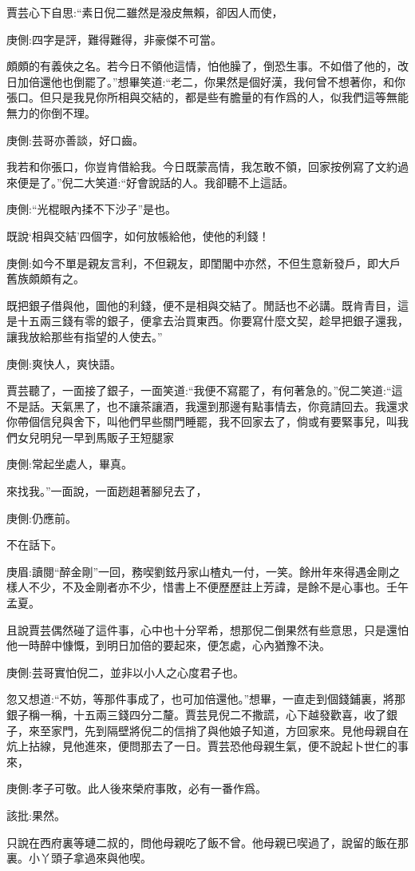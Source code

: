 \begin{parag}
    賈芸心下自思:“素日倪二雖然是潑皮無賴，卻因人而使，\begin{note}庚側:四字是評，難得難得，非豪傑不可當。\end{note}頗頗的有義俠之名。若今日不領他這情，怕他臊了，倒恐生事。不如借了他的，改日加倍還他也倒罷了。”想畢笑道:“老二，你果然是個好漢，我何曾不想著你，和你張口。但只是我見你所相與交結的，都是些有膽量的有作爲的人，似我們這等無能無力的你倒不理。\begin{note}庚側:芸哥亦善談，好口齒。\end{note}我若和你張口，你豈肯借給我。今日既蒙高情，我怎敢不領，回家按例寫了文約過來便是了。”倪二大笑道:“好會說話的人。我卻聽不上這話。\begin{note}庚側:“光棍眼內揉不下沙子”是也。\end{note}既說‘相與交結’四個字，如何放帳給他，使他的利錢！\begin{note}庚側:如今不單是親友言利，不但親友，即閨閣中亦然，不但生意新發戶，即大戶舊族頗頗有之。\end{note}既把銀子借與他，圖他的利錢，便不是相與交結了。閒話也不必講。既肯青目，這是十五兩三錢有零的銀子，便拿去治買東西。你要寫什麼文契，趁早把銀子還我，讓我放給那些有指望的人使去。”\begin{note}庚側:爽快人，爽快語。\end{note}賈芸聽了，一面接了銀子，一面笑道:“我便不寫罷了，有何著急的。”倪二笑道:“這不是話。天氣黑了，也不讓茶讓酒，我還到那邊有點事情去，你竟請回去。我還求你帶個信兒與舍下，叫他們早些關門睡罷，我不回家去了，倘或有要緊事兒，叫我們女兒明兒一早到馬販子王短腿家\begin{note}庚側:常起坐處人，畢真。\end{note}來找我。”一面說，一面趔趄著腳兒去了，\begin{note}庚側:仍應前。\end{note}不在話下。\begin{note}庚眉:讀閱“醉金剛”一回，務喫劉鉉丹家山楂丸一付，一笑。餘卅年來得遇金剛之樣人不少，不及金剛者亦不少，惜書上不便歷歷註上芳諱，是餘不是心事也。壬午孟夏。\end{note}
\end{parag}


\begin{parag}
    且說賈芸偶然碰了這件事，心中也十分罕希，想那倪二倒果然有些意思，只是還怕他一時醉中慷慨，到明日加倍的要起來，便怎處，心內猶豫不決。\begin{note}庚側:芸哥實怕倪二，並非以小人之心度君子也。\end{note}忽又想道:“不妨，等那件事成了，也可加倍還他。”想畢，一直走到個錢鋪裏，將那銀子稱一稱，十五兩三錢四分二釐。賈芸見倪二不撒謊，心下越發歡喜，收了銀子，來至家門，先到隔壁將倪二的信捎了與他娘子知道，方回家來。見他母親自在炕上拈線，見他進來，便問那去了一日。賈芸恐他母親生氣，便不說起卜世仁的事來，\begin{note}庚側:孝子可敬。此人後來榮府事敗，必有一番作爲。\end{note}\begin{note}該批:果然。\end{note}只說在西府裏等璉二叔的，問他母親吃了飯不曾。他母親已喫過了，說留的飯在那裏。小丫頭子拿過來與他喫。
\end{parag}


